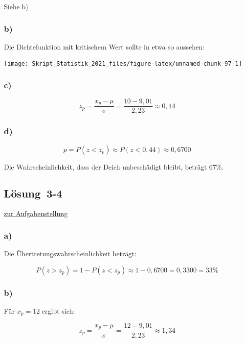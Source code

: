 \documentclass[
  11pt,
  ngerman,
  a4paper,
]{report}
\begin{document}
Siehe b)

\hypertarget{b-10}{%
\subsubsection{b)}\label{b-10}}

Die Dichtefunktion mit kritischem Wert sollte in etwa so aussehen:

\begin{center}\texttt{[image: Skript\_Statistik\_2021\_files/figure-latex/unnamed-chunk-97-1]} \end{center}

\hypertarget{c-8}{%
\subsubsection{c)}\label{c-8}}

\[z_p=\frac{x_p- \mu}{\sigma} = \frac{10-9,01}{2,23}\approx0,44\]

\hypertarget{d-3}{%
\subsubsection{d)}\label{d-3}}

\[p=P(z<z_p)\approx P(z<0,44)\approx0,6700\]

Die Wahrscheinlichkeit, dass der Deich unbeschädigt bleibt, beträgt 67\%.

\hypertarget{loesung-3-4}{%
\subsection{Lösung~3-4}\label{loesung-3-4}}

\protect\hyperlink{aufgabe-3-4}{zur Aufgabenstellung}

\hypertarget{a-11}{%
\subsubsection{a)}\label{a-11}}

Die Übertretungswahrscheinlichkeit beträgt:

\[P(z>z_p) = 1- P(z<z_p) \approx 1-0,6700 = 0,3300 = 33\% \]

\hypertarget{b-11}{%
\subsubsection{b)}\label{b-11}}

Für \(x_p=12\) ergibt sich:

\[ z_p=\frac{x_p- \mu}{\sigma} = \frac{12-9,01}{2,23}\approx1,34 \]
\end{document}
